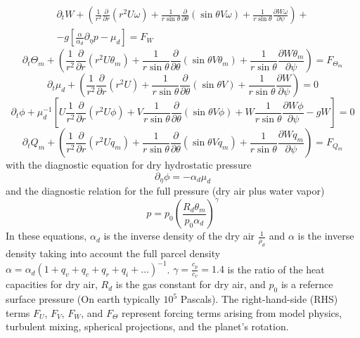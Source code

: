 \documentclass{article}
\begin{document}
\begin{sloppypar}
\begin{equation}
    \begin{split}
    \partial_t{W}+
    (\frac{1}{r^2}\frac{\partial}{\partial{r}}(r^2U\omega)+\frac{1}{r\sin\theta}\frac{\partial}{\partial\theta}(\sin\theta{V\omega})+\frac{1}{r\sin\theta}\frac{\partial{W\omega}}{\partial{\psi}})+ \\
    -g[\frac{\alpha}{\alpha_{d}}\partial_{\eta}p-\mu_{d}]
    =F_{W}
    \end{split}
\end{equation}
\begin{equation}
    \partial_t{\Theta_m}+(\frac{1}{r^2}\frac{\partial}{\partial{r}}(r^2U\theta_m)+\frac{1}{r\sin\theta}\frac{\partial}{\partial\theta}(\sin\theta{V\theta_m})+\frac{1}{r\sin\theta}\frac{\partial{W\theta_m}}{\partial{\psi}})=F_{\Theta_m}
\end{equation}
\begin{equation}
    \partial_t{\mu_d}+(\frac{1}{r^2}\frac{\partial}{\partial{r}}(r^2U)+\frac{1}{r\sin\theta}\frac{\partial}{\partial\theta}(\sin\theta{V})+\frac{1}{r\sin\theta}\frac{\partial{W}}{\partial{\psi}})=0
\end{equation}
\begin{equation}
    \partial_t{\phi}+\mu_d^{-1}[U\frac{1}{r^2}\frac{\partial}{\partial{r}}(r^2U\phi)+V\frac{1}{r\sin\theta}\frac{\partial}{\partial\theta}(\sin\theta{V\phi})+W\frac{1}{r\sin\theta}\frac{\partial{W\phi}}{\partial{\psi}}-gW]=0
\end{equation}
\begin{equation}
    \partial_t{Q_m}+(\frac{1}{r^2}\frac{\partial}{\partial{r}}(r^2Uq_m)+\frac{1}{r\sin\theta}\frac{\partial}{\partial\theta}(\sin\theta{Vq_m})+\frac{1}{r\sin\theta}\frac{\partial{Wq_m}}{\partial{\psi}})=F_{Q_m}
\end{equation}
with the diagnostic equation for dry hydrostatic pressure\newline
\begin{equation}
    \partial_{\eta}\phi=-\alpha_d\mu_d
\end{equation}
and the diagnostic relation for the full pressure (dry air plus water vapor)\newline
\begin{equation}
    p=p_0(\frac{R_d\theta_m}{p_0\alpha_d})^{\gamma}
\end{equation}
In these equations, $\alpha_d$ is the inverse density of the dry air $\frac{1}{\rho_d}$ and $\alpha$ is the inverse density taking into account the full parcel density $\alpha=\alpha_d(1+q_v+q_c+q_r+q_i+\ldots)^{-1}$.
$\gamma=\frac{c_p}{c_v}=1.4$ is the ratio of the heat capacities for dry air, $R_d$ is the gas constant for dry air, and $p_0$ is a refernce surface pressure (On earth typically $10^5$ Pascals). The right-hand-side (RHS) terms
$F_U$, $F_V$, $F_W$, and $F_{\Theta}$ represent forcing terms arising from model physics, turbulent mixing, spherical projections, and the planet's rotation.\newline

\end{sloppypar}
\end{document}
